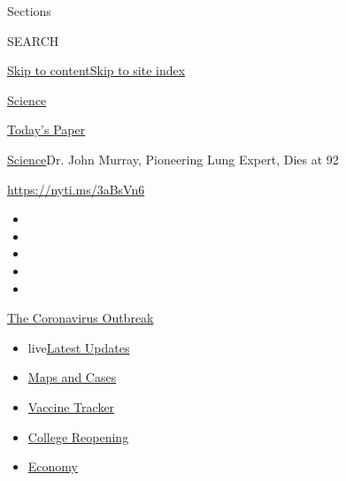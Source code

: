 Sections

SEARCH

\protect\hyperlink{site-content}{Skip to
content}\protect\hyperlink{site-index}{Skip to site index}

\href{https://www.nytimes3xbfgragh.onion/section/science}{Science}

\href{https://myaccount.nytimes3xbfgragh.onion/auth/login?response_type=cookie\&client_id=vi}{}

\href{https://www.nytimes3xbfgragh.onion/section/todayspaper}{Today's
Paper}

\href{/section/science}{Science}\textbar{}Dr. John Murray, Pioneering
Lung Expert, Dies at 92

\url{https://nyti.ms/3aBsVn6}

\begin{itemize}
\item
\item
\item
\item
\item
\end{itemize}

\href{https://www.nytimes3xbfgragh.onion/news-event/coronavirus?action=click\&pgtype=Article\&state=default\&region=TOP_BANNER\&context=storylines_menu}{The
Coronavirus Outbreak}

\begin{itemize}
\tightlist
\item
  live\href{https://www.nytimes3xbfgragh.onion/2020/08/04/world/coronavirus-covid-19.html?action=click\&pgtype=Article\&state=default\&region=TOP_BANNER\&context=storylines_menu}{Latest
  Updates}
\item
  \href{https://www.nytimes3xbfgragh.onion/interactive/2020/us/coronavirus-us-cases.html?action=click\&pgtype=Article\&state=default\&region=TOP_BANNER\&context=storylines_menu}{Maps
  and Cases}
\item
  \href{https://www.nytimes3xbfgragh.onion/interactive/2020/science/coronavirus-vaccine-tracker.html?action=click\&pgtype=Article\&state=default\&region=TOP_BANNER\&context=storylines_menu}{Vaccine
  Tracker}
\item
  \href{https://www.nytimes3xbfgragh.onion/2020/08/02/us/covid-college-reopening.html?action=click\&pgtype=Article\&state=default\&region=TOP_BANNER\&context=storylines_menu}{College
  Reopening}
\item
  \href{https://www.nytimes3xbfgragh.onion/live/2020/08/03/business/stock-market-today-coronavirus?action=click\&pgtype=Article\&state=default\&region=TOP_BANNER\&context=storylines_menu}{Economy}
\end{itemize}

